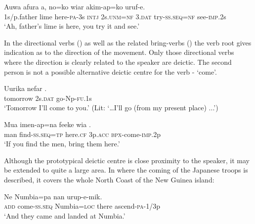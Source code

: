 \ea%
\label{ex:6:x1275}
\gll Auwa  afura    a,  no=ko  wiar akim-ap=ko  uruf-e.\\
1s/p.father  lime  here-\textsc{pa}-3s  \textsc{intj}  2s.\textsc{unm}=\textsc{nf}  3.\textsc{dat} try-\textsc{ss}.\textsc{seq}=\textsc{nf}  see-\textsc{imp}.2s\\
\glt `Ah, father's lime is here, you try it and see.'
\z

In the directional verbs  () as well as the related bring-verbs  () the verb root gives indication as to the direction of the movement. Only those directional verbs where the direction is clearly related to the speaker are deictic. The second person is not a possible alternative deictic centre for the verb - `come'.  

\ea%
\label{ex:6:x1278}
\gll Uurika  nefar  . \\
tomorrow  2s.\textsc{dat}  go-Np-\textsc{fu}.1s \\
\glt `Tomorrow I'll come to you.' (Lit: `{\dots}I'll go (from my present place) ...')
\z

\ea%
\label{ex:6:x1279}
\gll Mua  imen-ap=na  feeke  wia  . \\
man  find-\textsc{ss}.\textsc{seq}=\textsc{tp}  here.\textsc{cf}  3p.\textsc{acc}  \textsc{bpx}-come-\textsc{imp}.2p\\
\glt `If you find the men, bring them here.'
\z
%
%

Although the prototypical deictic centre is close proximity to the speaker, it may be extended to quite a large area. In  where the coming of the Japanese troops is described, it covers the whole North Coast of the New Guinea island: 

\ea%
\label{ex:6:x1892}
\gll Ne    Numbia=pa  nan  urup-e-mik. \\
\textsc{add}  come-\textsc{ss}.\textsc{seq}  Numbia=\textsc{loc}  there  ascend-\textsc{pa}-1/3p\\
\glt `And they came and landed at Numbia.'
\z

